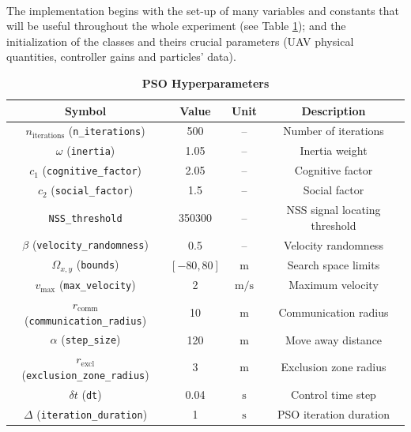 \documentclass[main]{subfiles}
\begin{document}
\noindent\\
The implementation begins with the set-up of 
many variables and constants that will be useful throughout 
the whole experiment (see Table \ref{tab:pso_parameters}); and the initialization of the classes and theirs
crucial parameters (UAV physical quantities, controller gains and 
particles' data).
\begin{table}
\centering
\caption{\textbf{PSO Hyperparameters}}
\begin{tabular}{c c c c}
\hline\hline
\textbf{Symbol}              & \textbf{Value}        & \textbf{Unit}           & \textbf{Description}      \\ \hline\hline                   
\(n_{\text{iterations}}\) (\texttt{n\_iterations})      & 500                   & --                      & Number of iterations      \\
\(\omega\) (\texttt{inertia})                          & 1.05                  & --                      & Inertia weight            \\
\(c_1\) (\texttt{cognitive\_factor})                   & 2.05                  & --                      & Cognitive factor          \\
\(c_2\) (\texttt{social\_factor})                      & 1.5                   & --                      & Social factor             \\
 \texttt{NSS\_threshold}                               & 350300                & --                      & NSS signal locating threshold\\
\(\beta\) (\texttt{velocity\_randomness})              & 0.5                   & --                      & Velocity randomness       \\ \hline
\(\Omega_{x,y}\) (\texttt{bounds})                     & \([-80, 80]\)         & \(\text{m}\)            & Search space limits       \\
\(v_{\text{max}}\) (\texttt{max\_velocity})            & 2                     & \(\text{m/s}\)          & Maximum velocity          \\                
\(r_{\text{comm}}\) (\texttt{communication\_radius})   & 10                    & \(\text{m}\)           & Communication radius      \\
\(\alpha\) (\texttt{step\_size})                       & 120                    & \(\text{m}\)           & Move away distance        \\
\(r_{\text{excl}}\) (\texttt{exclusion\_zone\_radius}) & 3                     & \(\text{m}\)           & Exclusion zone radius     \\
\(\delta t\) (\texttt{dt})                             & 0.04                  & \(\text{s}\)           & Control time step         \\
\(\Delta\) (\texttt{iteration\_duration})              & 1                     & \(\text{s}\)           & PSO iteration duration    \\
\hline\hline
\end{tabular}
\label{tab:pso_parameters}
\end{table}
\end{document}
